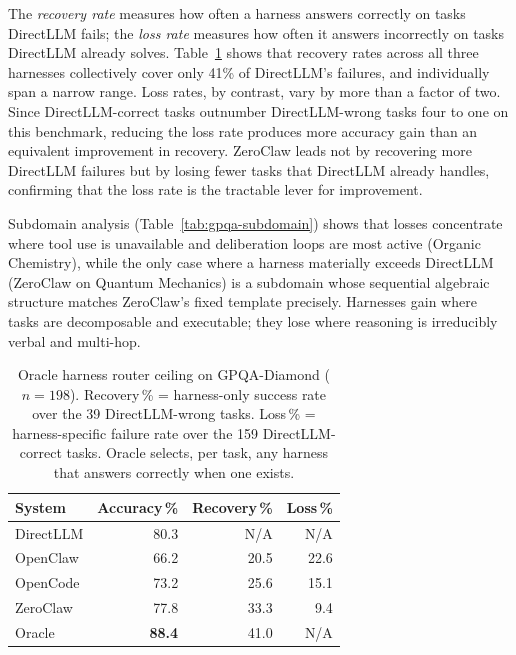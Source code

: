 The \emph{recovery rate} measures how often a harness answers correctly on tasks
DirectLLM fails; the \emph{loss rate} measures how often it answers incorrectly
on tasks DirectLLM already solves.
Table~\ref{tab:gpqa-oracle} shows that recovery rates across all three harnesses
collectively cover only 41\% of DirectLLM's failures, and individually span a
narrow range.
Loss rates, by contrast, vary by more than a factor of two.
Since DirectLLM-correct tasks outnumber DirectLLM-wrong tasks four to one on
this benchmark, reducing the loss rate produces more accuracy gain than an
equivalent improvement in recovery.
ZeroClaw leads not by recovering more DirectLLM failures but by losing fewer
tasks that DirectLLM already handles, confirming that the loss rate is the
tractable lever for improvement.

Subdomain analysis (Table~\ref{tab:gpqa-subdomain}) shows that losses concentrate
where tool use is unavailable and deliberation loops are most active (Organic
Chemistry), while the only case where a harness materially exceeds DirectLLM
(ZeroClaw on Quantum Mechanics) is a subdomain whose sequential algebraic
structure matches ZeroClaw's fixed template precisely.
Harnesses gain where tasks are decomposable and executable; they lose where
reasoning is irreducibly verbal and multi-hop.

\begin{table}[t]
\centering
\small
\caption{%
  Oracle harness router ceiling on GPQA-Diamond ($n=198$).
  Recovery\,\% = harness-only success rate over the 39 DirectLLM-wrong tasks.
  Loss\,\% = harness-specific failure rate over the 159 DirectLLM-correct tasks.
  Oracle selects, per task, any harness that answers correctly when one exists.
}
\label{tab:gpqa-oracle}
\setlength{\tabcolsep}{4pt}
\begin{tabular}{lrrr}
\toprule
System & Accuracy\,\% & Recovery\,\% & Loss\,\% \\
\midrule
DirectLLM & 80.3 & N/A  & N/A \\
OpenClaw  & 66.2 & 20.5 & 22.6 \\
OpenCode  & 73.2 & 25.6 & 15.1 \\
ZeroClaw  & 77.8 & 33.3 &  9.4 \\
\midrule
Oracle    & \textbf{88.4} & 41.0 & N/A \\
\bottomrule
\end{tabular}
\end{table}

